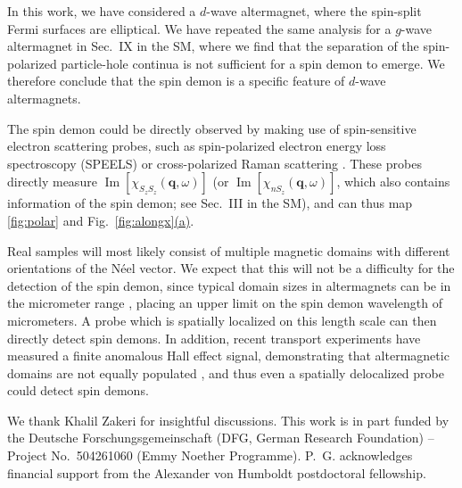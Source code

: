\documentclass[aps,prl,reprint,twocolumns,superscriptaddress]{revtex4-2}
\DeclareMathOperator{\Imm}{Im}
\newcommand{\subfigref}[2]{Fig.~\hyperref[#1]{\ref*{#1}#2}}
\begin{document}
	
	In this work, we have considered a $d$-wave altermagnet, where the spin-split Fermi surfaces are elliptical. We have repeated the same analysis for a $g$-wave altermagnet in Sec.~IX in the SM, where we find that the separation of the spin-polarized particle-hole continua is not sufficient for a spin demon to emerge. We therefore conclude that the spin demon is a specific feature of $d$-wave altermagnets.
	

	
	The spin demon could be directly observed by making use of spin-sensitive electron scattering probes, such as spin-polarized electron energy loss spectroscopy (SPEELS) \cite{plihalSpinWaveSignature1999} or cross-polarized Raman scattering \cite{kimPolarizedRamanSpectroscopy2020}. These probes directly measure $\Imm[\chi_{S_zS_z}(\bm q,\omega)]$ (or $\Imm[\chi_{nS_z}(\bm q,\omega)]$, which also contains information of the spin demon; see Sec.~III in the SM), and can thus map \cref{fig:polar} and \subfigref{fig:alongx}{(a)}.
	
	Real samples will most likely consist of multiple magnetic domains with different orientations of the N\'eel vector. We expect that this will not be a difficulty for the detection of the spin demon, since typical domain sizes in altermagnets can be in the micrometer range \cite{aminNanoscaleImagingControl2024a}, placing an upper limit on the spin demon wavelength of micrometers. A probe which is spatially localized on this length scale can then directly detect spin demons. In addition, recent transport experiments have measured a finite anomalous Hall effect signal, demonstrating that altermagnetic domains are not equally populated \cite{jeongMetallicityAnomalousHall2025a,leiviskaAnisotropyAnomalousHall2024, reichlovaObservationSpontaneousAnomalous2024a}, and thus even a spatially delocalized probe could detect spin demons.
	\begin{acknowledgments}
	We thank Khalil Zakeri for insightful discussions. This work is in part funded by the Deutsche Forschungsgemeinschaft (DFG, German Research Foundation) -- Project No.~504261060 (Emmy Noether Programme). P.~G. acknowledges financial support from the Alexander von Humboldt postdoctoral fellowship. 
	\end{acknowledgments}
	
\end{document}
